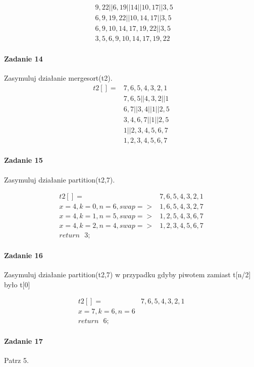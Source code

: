 \documentclass[18pt]{extarticle}
\begin{document}
\begin{align*}
    &{9,22 || 6,19 || 14 || 10,17 || 3,5} \\
    &{6,9,19,22 || 10,14,17 || 3,5} \\
    &{6,9,10,14,17,19,22 || 3,5} \\
    &{3,5,6,9,10,14,17,19,22}
\end{align*}

\paragraph{Zadanie 14} Zasymuluj działanie mergesort(t2).
\begin{align*}
    t2[]=&{7,6,5,4,3,2,1} \\
    &{7,6,5 || 4,3,2 || 1} \\
    &{6,7 || 3,4 || 1 || 2,5} \\
    &{3,4,6,7 || 1 || 2,5} \\
    &{1 || 2,3,4,5,6,7} \\
    &{1,2,3,4,5,6,7}
\end{align*}


\paragraph{Zadanie 15} Zasymuluj działanie partition(t2,7).

\begin{align*}
    t2[]=&{7,6,5,4,3,2,1} \\
    x=4, k=0, n=6, swap =>
    &{1,6,5,4,3,2,7} \\
    x=4, k=1, n=5, swap =>
    &{1,2,5,4,3,6,7} \\
    x=4, k=2, n=4, swap =>
    &{1,2,3,4,5,6,7} \\
    return\text{ }3;
\end{align*}


\paragraph{Zadanie 16} Zasymuluj działanie partition(t2,7) w przypadku gdyby piwotem zamiast t[n/2] było t[0]

\begin{align*}
    t2[]=&{7,6,5,4,3,2,1} \\
    x=7, k=6, n=6& \\
    return\text{ }6;
\end{align*}

\paragraph{Zadanie 17} Patrz 5.
\end{document}
